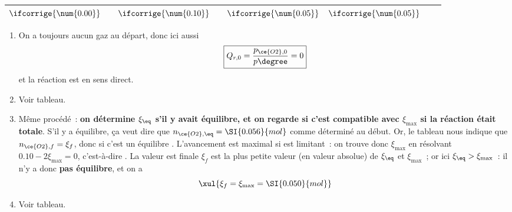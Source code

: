 \documentclass[../../main/main.tex]{subfiles}
\begin{document}
{\begin{center}
\begin{tabularx}{\linewidth}{|l|c||YdYdY||Y|}
			$\ifcorrige{\num{0.00}}$ & \vline               &
			$\ifcorrige{\num{0.10}}$ & \vline               &
			$\ifcorrige{\num{0.05}}$ &
			$\ifcorrige{\num{0.05}}$                          \\
			\hline
		\end{tabularx}
	\end{center}
	\begin{enumerate}[leftmargin=20pt, label=\alph* --]
		\item On a toujours aucun gaz au départ, donc ici aussi
		      \[\boxed{Q_{r,0} = \frac{p_{\ce{O2}, 0}}{p\degree} = 0}\]
		      et la réaction est en sens direct.
		\item Voir tableau.
		\item Même procédé~: \textbf{on détermine $\xi_{\eq}$ s'il y avait
			      équilibre, et on regarde si c'est compatible avec $\xi_{\max}$
			      si la réaction était totale}.
            \bigbreak
		      S'il y a équilibre, ça veut dire que $n_{\ce{O2}, \eq} =
			      \SI{0.056}{mol}$ comme déterminé au début. Or, le tableau nous
		      indique que $n_{\ce{O2}, f} = \xi_f$, donc si c'est un équilibre
		      .
          \bigbreak
		      L'avancement est maximal si  est limitant~: on trouve donc
		      $\xi_{\max}$ en résolvant $\num{0.10} - 2\xi_{\max} = 0$,
		      c'est-à-dire .
          \bigbreak
		      La valeur est finale $\xi_f$ est la plus petite valeur (en valeur
		      absolue) de $\xi_{\eq}$ et $\xi_{\max}$~; or ici $\xi_{\eq} >
			      \xi_{\max}$~: il n'y a donc \textbf{pas équilibre}, et on a
		      \[\xul{\xi_f = \xi_{\max} = \SI{0.050}{mol}}\]
		\item Voir tableau.
	\end{enumerate}
}
\end{document}
